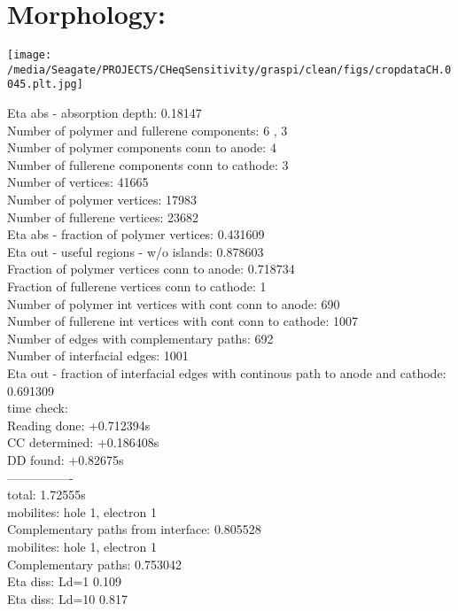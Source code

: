 \documentclass{article}
\begin{document}
\section{Morphology: }
\parbox{0.8\textwidth}{
\begin{center}\texttt{[image: /media/Seagate/PROJECTS/CHeqSensitivity/graspi/clean/figs/cropdataCH.0045.plt.jpg]} \end{center}
}\newline
\parbox{0.69\textwidth}{\begin{small}
Eta abs - absorption depth: 0.18147\\
Number of polymer and fullerene components: 6 , 3\\
Number of polymer components conn to anode: 4\\
Number of fullerene components conn to cathode: 3\\
Number of vertices: 41665\\
Number of polymer vertices: 17983\\
Number of fullerene vertices: 23682\\
Eta abs - fraction of polymer vertices: 0.431609\\
Eta out - useful regions - w/o islands: 0.878603\\
Fraction of polymer vertices conn to anode: 0.718734\\
Fraction of fullerene vertices conn to cathode: 1\\
Number of polymer int vertices with cont conn to anode: 690\\
Number of fullerene int vertices with cont conn to cathode: 1007\\
Number of edges with complementary paths: 692\\
Number of interfacial edges: 1001\\
Eta out - fraction of interfacial edges with continous path to anode and cathode: 0.691309\\
 time check:\\
Reading done: +0.712394s\\
CC determined: +0.186408s\\
DD found: +0.82675s\\
----------------\\
total: 1.72555s\\
mobilites: hole 1, electron 1\\
Complementary paths from interface: 0.805528\\
mobilites: hole 1, electron 1\\
Complementary paths: 0.753042\\
Eta diss: Ld=1  0.109\\
Eta diss: Ld=10 0.817\\

\end{small}}\newline
\end{document}
